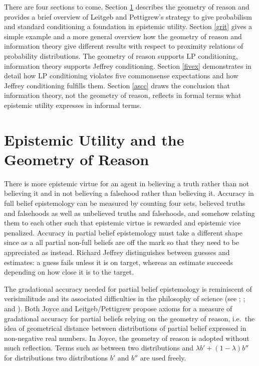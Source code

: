 \documentclass[11pt]{article}
\begin{document}
There are four sections to come. Section \ref{eugr} describes the
geometry of reason and provides a brief overview of Leitgeb and
Pettigrew's strategy to give probabilism and standard conditioning a
foundation in epistemic utility. Section \ref{grit} gives a simple
example and a more general overview how the geometry of reason and
information theory give different results with respect to proximity
relations of probability distributions. The geometry of reason
supports LP conditioning, information theory supports Jeffrey
conditioning. Section \ref{fivex} demonstrates in detail how LP
conditioning violates five commonsense expectations and how Jeffrey
conditioning fulfills them. Section \ref{ascc} draws the conclusion
that information theory, not the geometry of reason, reflects in
formal terms what epistemic utility expresses in informal terms.

\section{Epistemic Utility and the Geometry of Reason}
\label{eugr}

There is more epistemic virtue for an agent in believing a truth
rather than not believing it and in not believing a falsehood rather
than believing it. Accuracy in full belief epistemology can be
measured by counting four sets, believed truths and falsehoods as well
as unbelieved truths and falsehoods, and somehow relating them to each
other such that epistemic virtue is rewarded and epistemic vice
penalized. Accuracy in partial belief epistemology must take a
different shape since as a  all partial non-full beliefs
are off the mark so that they need to be appreciated as
 instead. Richard Jeffrey distinguishes between
guesses and estimates: a guess fails unless it is on target, whereas
an estimate succeeds depending on how close it is to the target.

The gradational accuracy needed for partial belief epistemology is
reminiscent of verisimilitude and its associated difficulties in the
philosophy of science (see ;
; and ). Both Joyce and
Leitgeb/Pettigrew propose axioms for a measure of gradational accuracy
for partial beliefs relying on the geometry of reason, i.e.\ the idea
of geometrical distance between distributions of partial belief
expressed in non-negative real numbers. In Joyce, the geometry of
reason is adopted without much reflection. Terms such as
 between two distributions and
$\lambda{}b'+(1-\lambda)b''$ for distributions  two
distributions $b'$ and $b''$ are used freely. 
\end{document}
